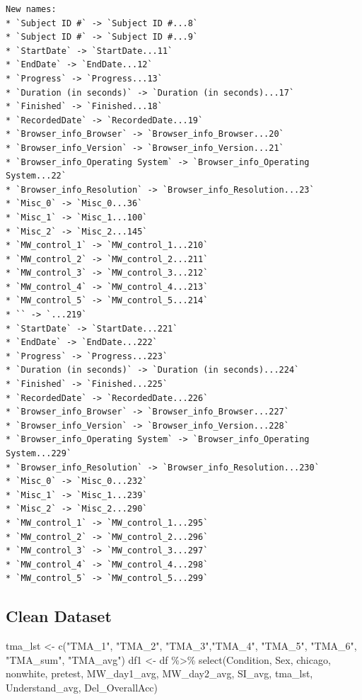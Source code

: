\documentclass[
  letterpaper,
  DIV=11,
  numbers=noendperiod]{scrartcl}
\newenvironment{Shaded}{\begin{snugshade}}{\end{snugshade}}
\newcommand{\FunctionTok}[1]{\textcolor[rgb]{0.02,0.16,0.49}{#1}}
\newcommand{\NormalTok}[1]{\textcolor[rgb]{0.00,0.44,0.13}{#1}}
\newcommand{\OtherTok}[1]{\textcolor[rgb]{0.00,0.44,0.13}{#1}}
\newcommand{\SpecialCharTok}[1]{\textcolor[rgb]{0.25,0.44,0.63}{#1}}
\newcommand{\StringTok}[1]{\textcolor[rgb]{0.25,0.44,0.63}{#1}}
\begin{document}
\begin{verbatim}
New names:
* `Subject ID #` -> `Subject ID #...8`
* `Subject ID #` -> `Subject ID #...9`
* `StartDate` -> `StartDate...11`
* `EndDate` -> `EndDate...12`
* `Progress` -> `Progress...13`
* `Duration (in seconds)` -> `Duration (in seconds)...17`
* `Finished` -> `Finished...18`
* `RecordedDate` -> `RecordedDate...19`
* `Browser_info_Browser` -> `Browser_info_Browser...20`
* `Browser_info_Version` -> `Browser_info_Version...21`
* `Browser_info_Operating System` -> `Browser_info_Operating System...22`
* `Browser_info_Resolution` -> `Browser_info_Resolution...23`
* `Misc_0` -> `Misc_0...36`
* `Misc_1` -> `Misc_1...100`
* `Misc_2` -> `Misc_2...145`
* `MW_control_1` -> `MW_control_1...210`
* `MW_control_2` -> `MW_control_2...211`
* `MW_control_3` -> `MW_control_3...212`
* `MW_control_4` -> `MW_control_4...213`
* `MW_control_5` -> `MW_control_5...214`
* `` -> `...219`
* `StartDate` -> `StartDate...221`
* `EndDate` -> `EndDate...222`
* `Progress` -> `Progress...223`
* `Duration (in seconds)` -> `Duration (in seconds)...224`
* `Finished` -> `Finished...225`
* `RecordedDate` -> `RecordedDate...226`
* `Browser_info_Browser` -> `Browser_info_Browser...227`
* `Browser_info_Version` -> `Browser_info_Version...228`
* `Browser_info_Operating System` -> `Browser_info_Operating System...229`
* `Browser_info_Resolution` -> `Browser_info_Resolution...230`
* `Misc_0` -> `Misc_0...232`
* `Misc_1` -> `Misc_1...239`
* `Misc_2` -> `Misc_2...290`
* `MW_control_1` -> `MW_control_1...295`
* `MW_control_2` -> `MW_control_2...296`
* `MW_control_3` -> `MW_control_3...297`
* `MW_control_4` -> `MW_control_4...298`
* `MW_control_5` -> `MW_control_5...299`
\end{verbatim}

\hypertarget{clean-dataset}{%
\subsection{Clean Dataset}\label{clean-dataset}}

\begin{Shaded}
\begin{Highlighting}[]
\NormalTok{tma\_lst }\OtherTok{\textless{}{-}} \FunctionTok{c}\NormalTok{(}\StringTok{"TMA\_1"}\NormalTok{, }\StringTok{"TMA\_2"}\NormalTok{, }\StringTok{"TMA\_3"}\NormalTok{,}\StringTok{"TMA\_4"}\NormalTok{, }\StringTok{"TMA\_5"}\NormalTok{, }\StringTok{"TMA\_6"}\NormalTok{,}
             \StringTok{"TMA\_sum"}\NormalTok{, }\StringTok{"TMA\_avg"}\NormalTok{)}
\NormalTok{df1 }\OtherTok{\textless{}{-}}\NormalTok{ df }\SpecialCharTok{\%\textgreater{}\%} \FunctionTok{select}\NormalTok{(Condition, Sex, chicago, nonwhite, pretest,}
\NormalTok{              MW\_day1\_avg, MW\_day2\_avg, SI\_avg, tma\_lst,}
\NormalTok{              Understand\_avg, Del\_OverallAcc)}
\end{Highlighting}
\end{Shaded}
\end{document}
